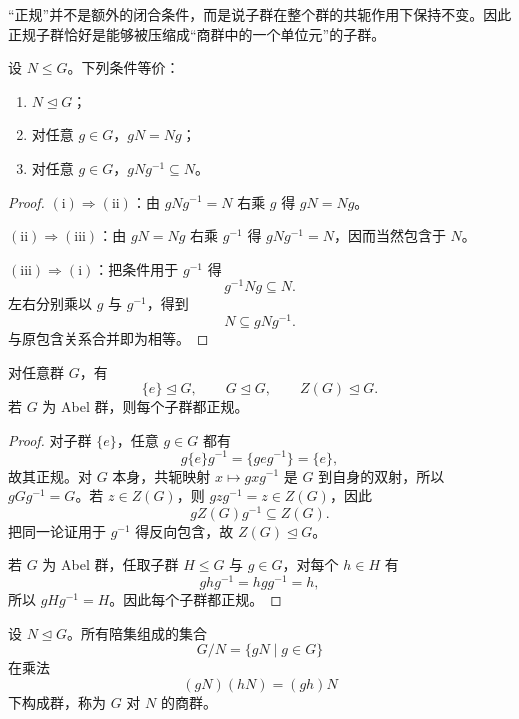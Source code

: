 “正规”并不是额外的闭合条件，而是说子群在整个群的共轭作用下保持不变。因此正规子群恰好是能够被压缩成“商群中的一个单位元”的子群。

\begin{theorem}[正规性的等价刻画]
设 $N\leqslant G$。下列条件等价：
\begin{enumerate}[label=(\roman*),leftmargin=3em]
  \item $N\mathrel{\trianglelefteq} G$；
  \item 对任意 $g\in G$，$gN=Ng$；
  \item 对任意 $g\in G$，$gNg^{-1}\subseteq N$。
\end{enumerate}
\label{thm:normal-equivalences}

\end{theorem}

\begin{proof}
$(\mathrm{i})\Rightarrow(\mathrm{ii})$：由 $gNg^{-1}=N$ 右乘 $g$ 得 $gN=Ng$。

$(\mathrm{ii})\Rightarrow(\mathrm{iii})$：由 $gN=Ng$ 右乘 $g^{-1}$ 得 $gNg^{-1}=N$，因而当然包含于 $N$。

$(\mathrm{iii})\Rightarrow(\mathrm{i})$：把条件用于 $g^{-1}$ 得
\[
g^{-1}Ng\subseteq N.
\]
左右分别乘以 $g$ 与 $g^{-1}$，得到
\[
N\subseteq gNg^{-1}.
\]
与原包含关系合并即为相等。
\end{proof}

\begin{proposition}[两个基本正规子群]
对任意群 $G$，有
\[
\{e\}\mathrel{\trianglelefteq} G,
\qquad
G\mathrel{\trianglelefteq} G,
\qquad
Z(G)\mathrel{\trianglelefteq} G.
\]
若 $G$ 为 Abel 群，则每个子群都正规。
\label{prop:basic-normal-subgroups}

\end{proposition}

\begin{proof}
对子群 $\{e\}$，任意 $g\in G$ 都有
\[
g\{e\}g^{-1}=\{geg^{-1}\}=\{e\},
\]
故其正规。对 $G$ 本身，共轭映射 $x\mapsto gxg^{-1}$ 是 $G$ 到自身的双射，所以 $gGg^{-1}=G$。若 $z\in Z(G)$，则 $gzg^{-1}=z\in Z(G)$，因此
\[
gZ(G)g^{-1}\subseteq Z(G).
\]
把同一论证用于 $g^{-1}$ 得反向包含，故 $Z(G)\mathrel{\trianglelefteq} G$。

若 $G$ 为 Abel 群，任取子群 $H\leqslant G$ 与 $g\in G$，对每个 $h\in H$ 有
\[
ghg^{-1}=hgg^{-1}=h,
\]
所以 $gHg^{-1}=H$。因此每个子群都正规。
\end{proof}

\begin{definition}[商群]
设 $N\mathrel{\trianglelefteq} G$。所有陪集组成的集合
\[
G/N=\{gN\mid g\in G\}
\]
在乘法
\[
(gN)(hN)=(gh)N
\label{eq:quotient-product}
\]
下构成群，称为 $G$ 对 $N$ 的商群。
\label{def:quotient-group}
\end{definition}

